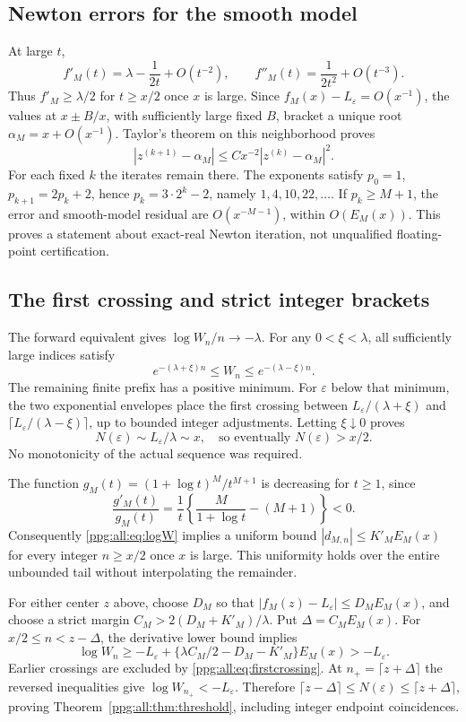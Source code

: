 \documentclass[11pt,letterpaper]{article}
\theoremstyle{remark}\newtheorem{remark}[theorem]{Remark}
\numberwithin{equation}{section}
\begin{document}
\subsection{Newton errors for the smooth model}
At large $t$,
\[
 f'_M(t)=\lambda-\frac1{2t}+O(t^{-2}),\qquad
 f''_M(t)=\frac1{2t^2}+O(t^{-3}).
\]
Thus $f'_M\ge\lambda/2$ for $t\ge x/2$ once $x$ is large. Since $f_M(x)-L_\varepsilon=O(x^{-1})$, the values at $x\pm B/x$, with sufficiently large fixed $B$, bracket a unique root $\alpha_M=x+O(x^{-1})$. Taylor's theorem on this neighborhood proves
\[
 |z^{(k+1)}-\alpha_M|\le Cx^{-2}|z^{(k)}-\alpha_M|^2.
\]
For each fixed $k$ the iterates remain there. The exponents satisfy
$p_0=1$, $p_{k+1}=2p_k+2$, hence $p_k=3\cdot2^k-2$, namely $1,4,10,22,\ldots$. If $p_k\ge M+1$, the error and smooth-model residual are $O(x^{-M-1})$, within $O(E_M(x))$. This proves a statement about exact-real Newton iteration, not unqualified floating-point certification.

\subsection{The first crossing and strict integer brackets}
The forward equivalent gives $\log W_n/n\to-\lambda$. For any $0<\xi<\lambda$, all sufficiently large indices satisfy
\[
 e^{-(\lambda+\xi)n}\le W_n\le e^{-(\lambda-\xi)n}.
\]
The remaining finite prefix has a positive minimum. For $\varepsilon$ below that minimum, the two exponential envelopes place the first crossing between $L_\varepsilon/(\lambda+\xi)$ and $\lceil L_\varepsilon/(\lambda-\xi)\rceil$, up to bounded integer adjustments. Letting $\xi\downarrow0$ proves
\begin{equation}\label{ppg:all:eq:firstcrossing}
 N(\varepsilon)\sim L_\varepsilon/\lambda\sim x,
 \quad\text{so eventually }N(\varepsilon)>x/2.
\end{equation}
No monotonicity of the actual sequence was required.

The function $g_M(t)=(1+\log t)^M/t^{M+1}$ is decreasing for $t\ge1$, since
\[
 \frac{g'_M(t)}{g_M(t)}=
 \frac1t\left\{\frac M{1+\log t}-(M+1)\right\}<0.
\]
Consequently \eqref{ppg:all:eq:logW} implies a uniform bound
$|d_{M,n}|\le K'_ME_M(x)$ for every integer $n\ge x/2$ once $x$ is large. This uniformity holds over the entire unbounded tail without interpolating the remainder.

For either center $z$ above, choose $D_M$ so that
$|f_M(z)-L_\varepsilon|\le D_ME_M(x)$, and choose a strict margin
$C_M>2(D_M+K'_M)/\lambda$. Put $\Delta=C_ME_M(x)$. For $x/2\le n<z-\Delta$, the derivative lower bound implies
\[
 \log W_n\ge-L_\varepsilon+
   \{\lambda C_M/2-D_M-K'_M\}E_M(x)>-L_\varepsilon.
\]
Earlier crossings are excluded by \eqref{ppg:all:eq:firstcrossing}. At
$n_+=\lceil z+\Delta\rceil$ the reversed inequalities give
$\log W_{n_+}<-L_\varepsilon$. Therefore
$\lceil z-\Delta\rceil\le N(\varepsilon)\le\lceil z+\Delta\rceil$, proving Theorem~\ref{ppg:all:thm:threshold}, including integer endpoint coincidences.
\end{document}
